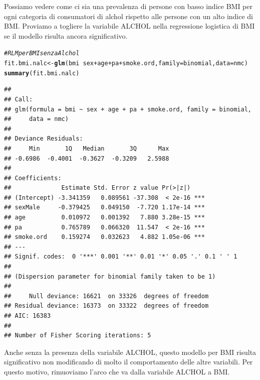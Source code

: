 \documentclass{article}\usepackage[]{graphicx}\usepackage[]{xcolor}
\makeatletter
\newcommand{\hlcom}[1]{\textcolor[rgb]{0.678,0.584,0.686}{\textit{#1}}}%
\newcommand{\hlopt}[1]{\textcolor[rgb]{0,0,0}{#1}}%
\newcommand{\hlstd}[1]{\textcolor[rgb]{0.345,0.345,0.345}{#1}}%
\newcommand{\hlkwb}[1]{\textcolor[rgb]{0.69,0.353,0.396}{#1}}%
\newcommand{\hlkwc}[1]{\textcolor[rgb]{0.333,0.667,0.333}{#1}}%
\newcommand{\hlkwd}[1]{\textcolor[rgb]{0.737,0.353,0.396}{\textbf{#1}}}%
\newenvironment{kframe}{%
 \def\at@end@of@kframe{}%
 \ifinner\ifhmode%
  \def\at@end@of@kframe{\end{minipage}}%
  \begin{minipage}{\columnwidth}%
 \fi\fi%
 \def\FrameCommand##1{\hskip\@totalleftmargin \hskip-\fboxsep
 \colorbox{shadecolor}{##1}\hskip-\fboxsep
     \hskip-\linewidth \hskip-\@totalleftmargin \hskip\columnwidth}%
 \MakeFramed {\advance\hsize-\width
   \@totalleftmargin\z@ \linewidth\hsize
   \@setminipage}}%
 {\par\unskip\endMakeFramed%
 \at@end@of@kframe}
\newenvironment{knitrout}{}{} %
\makeatother
\begin{document}
    Possiamo vedere come ci sia una prevalenza di persone con basso indice BMI 
    per ogni categoria di consumatori di alchol rispetto alle persone con un 
    alto indice di BMI.
    Proviamo a togliere la variabile ALCHOL nella regressione logistica di BMI 
    se il modello risulta ancora significativo.
    
\begin{knitrout}
\color{fgcolor}\begin{kframe}
\begin{alltt}
\hlcom{#RLM per BMI senza Alchol}
\hlstd{fit.bmi.nalc} \hlkwb{<-} \hlkwd{glm}\hlstd{(bmi}\hlopt{~}\hlstd{sex}\hlopt{+}\hlstd{age}\hlopt{+}\hlstd{pa}\hlopt{+}\hlstd{smoke.ord,} \hlkwc{family}\hlstd{=binomial,} \hlkwc{data}\hlstd{=nmc)}
\hlkwd{summary}\hlstd{(fit.bmi.nalc)}
\end{alltt}
\begin{verbatim}
## 
## Call:
## glm(formula = bmi ~ sex + age + pa + smoke.ord, family = binomial, 
##     data = nmc)
## 
## Deviance Residuals: 
##     Min       1Q   Median       3Q      Max  
## -0.6986  -0.4001  -0.3627  -0.3209   2.5988  
## 
## Coefficients:
##              Estimate Std. Error z value Pr(>|z|)    
## (Intercept) -3.341359   0.089561 -37.308  < 2e-16 ***
## sexMale     -0.379425   0.049150  -7.720 1.17e-14 ***
## age          0.010972   0.001392   7.880 3.28e-15 ***
## pa           0.765789   0.066320  11.547  < 2e-16 ***
## smoke.ord    0.159274   0.032623   4.882 1.05e-06 ***
## ---
## Signif. codes:  0 '***' 0.001 '**' 0.01 '*' 0.05 '.' 0.1 ' ' 1
## 
## (Dispersion parameter for binomial family taken to be 1)
## 
##     Null deviance: 16621  on 33326  degrees of freedom
## Residual deviance: 16373  on 33322  degrees of freedom
## AIC: 16383
## 
## Number of Fisher Scoring iterations: 5
\end{verbatim}
\end{kframe}
\end{knitrout}
    
    Anche senza la presenza della variabile ALCHOL, questo modello per BMI
    risulta significativo non modificando di molto il comportamento delle altre 
    variabili. Per questo motivo, rimuoviamo l'arco che va dalla variabile
    ALCHOL a BMI.
    
\end{document}
